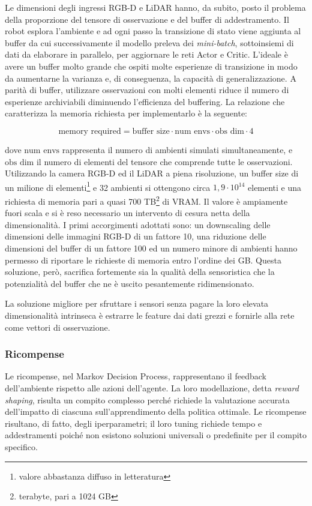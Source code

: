 Le dimensioni degli ingressi RGB-D e LiDAR hanno, da subito, posto il problema della proporzione del tensore di osservazione e del buffer di addestramento. Il robot esplora l’ambiente e ad ogni passo la transizione di stato viene aggiunta al buffer da cui successivamente il modello preleva dei \textit{mini-batch}, sottoinsiemi di dati da elaborare in parallelo, per aggiornare le reti Actor e Critic. L'ideale è avere un buffer molto grande che ospiti molte esperienze di transizione in modo da aumentarne la varianza e, di conseguenza, la capacità di generalizzazione. A parità di buffer, utilizzare osservazioni con molti elementi riduce il numero di esperienze archiviabili diminuendo l'efficienza del buffering. La relazione che caratterizza la memoria richiesta per implementarlo è la seguente:

\begin{equation}
    \text{memory required} = \text{buffer size} \cdot \text{num envs}\cdot \text{obs dim} \cdot 4
\end{equation}

dove $\text{num envs}$ rappresenta il numero di ambienti simulati simultaneamente, e $\text{obs dim}$ il numero di elementi del tensore che comprende tutte le osservazioni. Utilizzando la camera RGB-D ed il LiDAR a piena risoluzione, un buffer size di un milione di elementi\footnote{valore abbastanza diffuso in letteratura} e 32 ambienti si ottengono circa $1,9\cdot 10^{14}$ elementi e una richiesta di memoria pari a quasi 700 TB\footnote{terabyte, pari a 1024 GB} di VRAM. Il valore è ampiamente fuori scala e si è reso necessario un intervento di cesura netta della dimensionalità. I primi accorgimenti adottati sono: un downscaling delle dimensioni delle immagini RGB-D di un fattore 10, una riduzione delle dimensioni del buffer di un fattore 100 ed un numero minore di ambienti hanno permesso di riportare le richieste di memoria entro l'ordine dei GB. Questa soluzione, però, sacrifica fortemente sia la qualità della sensoristica che la potenzialità del buffer che ne è uscito pesantemente ridimensionato.

La soluzione migliore per sfruttare i sensori senza pagare la loro elevata dimensionalità intrinseca è estrarre le feature dai dati grezzi e fornirle alla rete come vettori di osservazione. 



\subsubsection{Ricompense}
Le ricompense, nel Markov Decision Process, rappresentano il feedback dell'ambiente rispetto alle azioni dell'agente. La loro modellazione, detta \textit{reward shaping}, risulta un compito complesso perché richiede la valutazione accurata dell'impatto di ciascuna sull'apprendimento della politica ottimale. Le ricompense risultano, di fatto, degli iperparametri; il loro tuning richiede tempo e addestramenti poiché non esistono soluzioni universali o predefinite per il compito specifico. 

